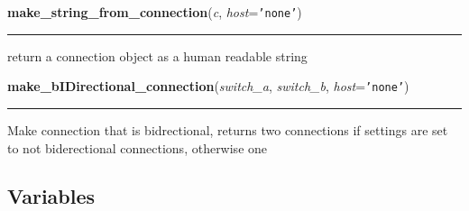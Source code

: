     \label{Data_Plane_DHT:make_string_from_connection}

    \vspace{0.5ex}

\hspace{.8\funcindent}\begin{boxedminipage}{\funcwidth}

    \raggedright \textbf{make\_string\_from\_connection}(\textit{c}, \textit{host}={\tt \texttt{'}\texttt{none}\texttt{'}})

    \vspace{-1.5ex}

    \rule{\textwidth}{0.5\fboxrule}
\setlength{\parskip}{2ex}
    return a connection object as a human readable string

\setlength{\parskip}{1ex}
    \end{boxedminipage}

    \label{Data_Plane_DHT:make_bIDirectional_connection}

    \vspace{0.5ex}

\hspace{.8\funcindent}\begin{boxedminipage}{\funcwidth}

    \raggedright \textbf{make\_bIDirectional\_connection}(\textit{switch\_a}, \textit{switch\_b}, \textit{host}={\tt \texttt{'}\texttt{none}\texttt{'}})

    \vspace{-1.5ex}

    \rule{\textwidth}{0.5\fboxrule}
\setlength{\parskip}{2ex}
    Make connection that is bidrectional, returns two connections if 
    settings are set to not biderectional connections, otherwise one

\setlength{\parskip}{1ex}
    \end{boxedminipage}



  \subsection{Variables}

